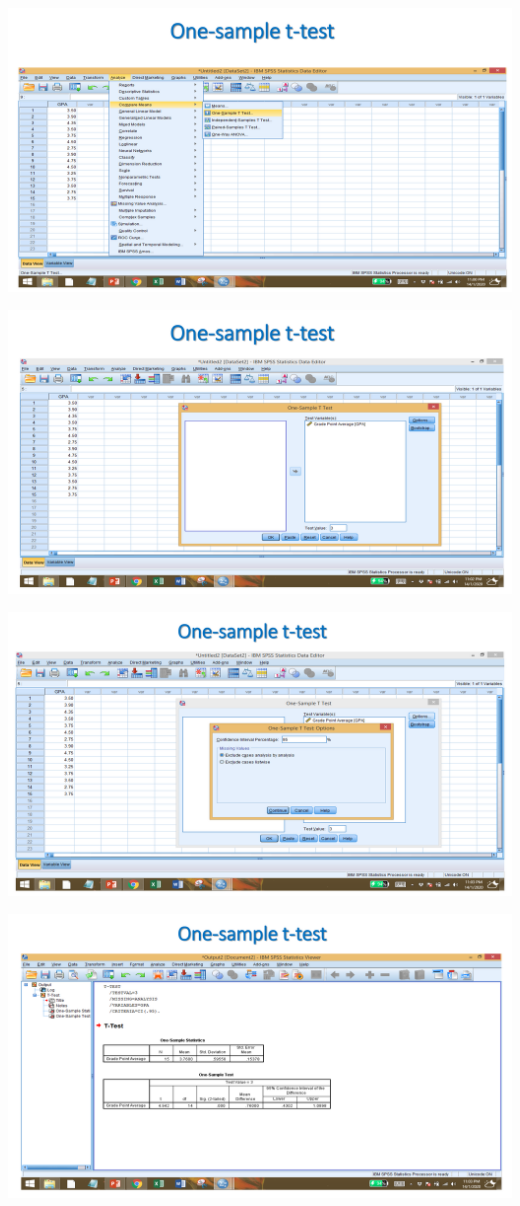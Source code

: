\documentclass[
  letterpaper,
  DIV=11,
  numbers=noendperiod]{scrreprt}
\begin{document}
\includegraphics{images/slides/img_Page_088.png}

\includegraphics{images/slides/img_Page_089.png}

\includegraphics{images/slides/img_Page_090.png}

\includegraphics{images/slides/img_Page_091.png}
\end{document}

